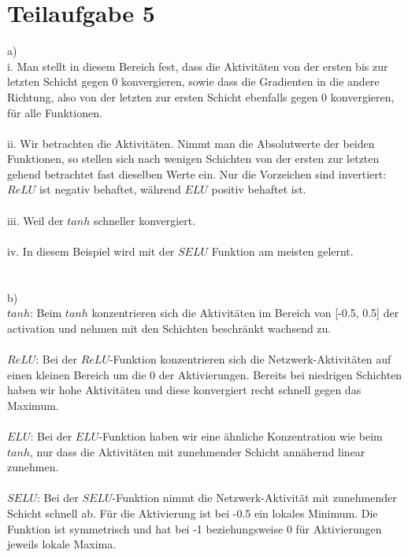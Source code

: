 \documentclass[a4paper, 11pt]{article}
\begin{document}
\section*{Teilaufgabe 5}
a)\\
i. Man stellt in diesem Bereich fest, dass die Aktivitäten von der ersten bis zur letzten Schicht gegen 0 konvergieren, sowie dass die Gradienten in die andere Richtung, also von der letzten zur ersten Schicht ebenfalls gegen 0 konvergieren, für alle Funktionen.\\
\\
ii. Wir betrachten die Aktivitäten. Nimmt man die Absolutwerte der beiden Funktionen, so stellen sich nach wenigen Schichten von der ersten zur letzten gehend betrachtet fast dieselben Werte ein. Nur die Vorzeichen sind invertiert: $ReLU$ ist negativ behaftet, während $ELU$ positiv behaftet ist.\\
\\
iii. Weil der $tanh$ schneller konvergiert.\\
\\
iv. In diesem Beispiel wird mit der $SELU$ Funktion am meisten gelernt.\\
\\
\\
b)\\
$tanh$: Beim $tanh$ konzentrieren sich die Aktivitäten im Bereich von [-0.5, 0.5] der activation und nehmen mit den Schichten beschränkt wachsend zu.\\
\\
$ReLU$: Bei der $ReLU$-Funktion konzentrieren sich die Netzwerk-Aktivitäten auf einen kleinen Bereich um die 0 der Aktivierungen. Bereits bei niedrigen Schichten haben wir hohe Aktivitäten und diese konvergiert recht schnell gegen das Maximum.\\
\\
$ELU$: Bei der $ELU$-Funktion haben wir eine ähnliche Konzentration wie beim $tanh$, nur dass die Aktivitäten mit zunehmender Schicht annähernd linear zunehmen.\\
\\
$SELU$: Bei der $SELU$-Funktion nimmt die Netzwerk-Aktivität mit zunehmender Schicht schnell ab. Für die Aktivierung ist bei -0.5 ein lokales Minimum. Die Funktion ist symmetrisch und hat bei -1 beziehungsweise 0 für Aktivierungen jeweils lokale Maxima.
\end{document}
